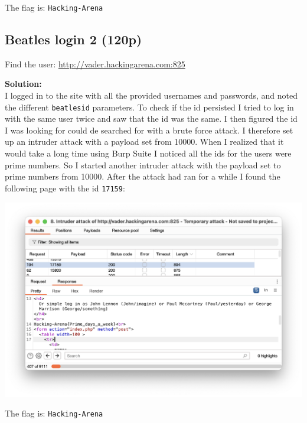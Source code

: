 The flag is: \texttt{Hacking-Arena}

\subsection{}

\newpage
\subsection{Beatles login 2 (120p)}
Find the user: \url{http://vader.hackingarena.com:825}

\textbf{Solution:}\\
I logged in to the site with all the provided usernames and passwords, and noted the different \texttt{beatlesid} parameters. 
To check if the id persisted I tried to log in with the same user twice and saw that the id was the same. 
I then figured the id I was looking for could de searched for with a brute force attack. 
I therefore set up an intruder attack with a payload set from 10000. 
When I realized that it would take a long time using Burp Suite I noticed all the ids for the users were prime numbers. 
So I started another intruder attack with the payload set to prime numbers from 10000. After the attack had ran for a while I found the following page with the id \texttt{17159}:

\begin{center}
    \includegraphics[width=16cm]{img/Web hacking/Beatles login 2/Screenshot 2023-11-09 at 17.33.16.png}
\end{center}

The flag is: \texttt{Hacking-Arena}